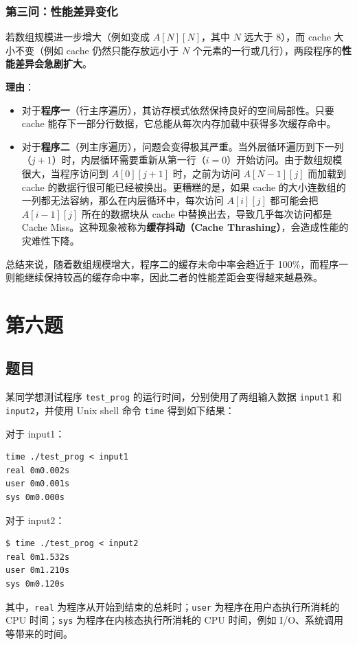 \subsection{第三问：性能差异变化}
若数组规模进一步增大（例如变成 $A[N][N]$，其中 $N$ 远大于 8），而 cache 大小不变（例如 cache 仍然只能存放远小于 $N$ 个元素的一行或几行），两段程序的\textbf{性能差异会急剧扩大}。

\textbf{理由}：
\begin{itemize}
    \item 对于\textbf{程序一}（行主序遍历），其访存模式依然保持良好的空间局部性。只要 cache 能存下一部分行数据，它总能从每次内存加载中获得多次缓存命中。
    \item 对于\textbf{程序二}（列主序遍历），问题会变得极其严重。当外层循环遍历到下一列（$j+1$）时，内层循环需要重新从第一行（$i=0$）开始访问。由于数组规模很大，当程序访问到 $A[0][j+1]$ 时，之前为访问 $A[N-1][j]$ 而加载到 cache 的数据行很可能已经被换出。更糟糕的是，如果 cache 的大小连数组的一列都无法容纳，那么在内层循环中，每次访问 $A[i][j]$ 都可能会把 $A[i-1][j]$ 所在的数据块从 cache 中替换出去，导致几乎每次访问都是 Cache Miss。这种现象被称为\textbf{缓存抖动（Cache Thrashing）}，会造成性能的灾难性下降。
\end{itemize}
总结来说，随着数组规模增大，程序二的缓存未命中率会趋近于 100\%，而程序一则能继续保持较高的缓存命中率，因此二者的性能差距会变得越来越悬殊。

\chapter{第六题}

\section{题目}

某同学想测试程序 \texttt{test\_prog} 的运行时间，分别使用了两组输入数据 \texttt{input1} 和 \texttt{input2}，并使用 Unix shell 命令 \texttt{time} 得到如下结果：

对于 input1：
\begin{lstlisting}[style=cleancpp]
time ./test_prog < input1
real 0m0.002s
user 0m0.001s
sys 0m0.000s
\end{lstlisting}

对于 input2：
\begin{lstlisting}[style=cleancpp]
$ time ./test_prog < input2
real 0m1.532s
user 0m1.210s
sys 0m0.120s
\end{lstlisting}
其中，\texttt{real} 为程序从开始到结束的总耗时；\texttt{user} 为程序在用户态执行所消耗的 CPU 时间；\texttt{sys} 为程序在内核态执行所消耗的 CPU 时间，例如 I/O、系统调用等带来的时间。

